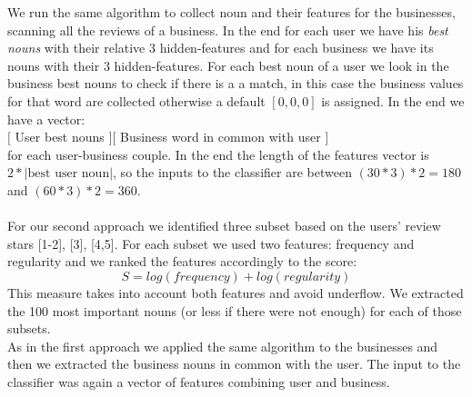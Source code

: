 \documentclass[11pt]{article}
\begin{document}
We run the same algorithm to collect noun and their features for the businesses, scanning all the reviews of a business.
In the end for each user we have his\textit{ best nouns} with their relative 3 hidden-features and for each business we have its nouns with their 3 hidden-features. For each best noun of a user we look in the business best nouns to check if there is a a match, in this case the business values for that word are collected otherwise a default $[0,0,0]$ is assigned.
In the end we have a vector:\\
$[$ User best nouns $]  [$ Business word in common with user $]$\\
for each user-business couple.
In the end the length of the features vector is $2 * |\text{best user noun}|$, so the inputs to the classifier are between $(30*3)*2=180$ and $(60*3)*2=360$.\\\\
For our second approach we identified three subset based on the users' review stars [1-2], [3], [4,5]. For each subset we used two features: frequency and regularity and we ranked the features accordingly to the score:\[ S=log(frequency)+log(regularity) \]
This measure takes into account both features and avoid underflow.
We extracted the 100 most important nouns (or less if there were not enough) for each of those subsets.\\
As in the first approach we applied the same algorithm to the businesses and then we extracted the business nouns in common with the user. The input to the classifier was again a vector of features combining user and business.\\
\end{document}
